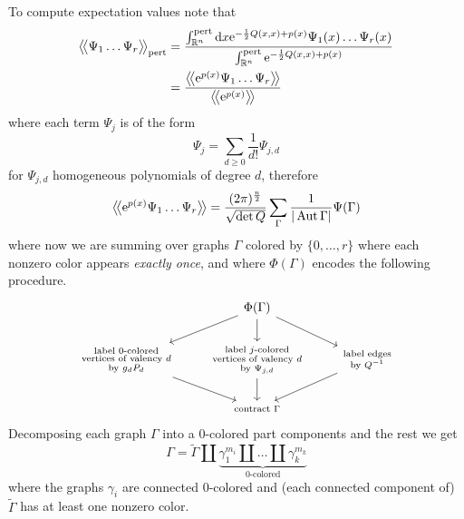 To compute expectation values note that
\begin{align*}
  \big \langle \! \big \langle {\Psi_1 \dots \Psi_r} \big \rangle \! \big \rangle_\text{pert}
  &= \frac{
    \int_{\mathbb{R}^n}^\text{pert} \mathrm{d} x
    \mathrm{e}^{-\frac{1}{2} Q(x, x) + p(x)} \Psi_1(x) \dots \Psi_r (x)
  }{
    \int_{\mathbb{R}^n}^\text{pert} \mathrm{e}^{-\frac{1}{2} Q(x, x) + p(x)}
  }\\
  &= \frac{
    \big \langle \! \big \langle {\mathrm{e}^{p(x)} \Psi_1 \dots \Psi_r} \big \rangle \! \big \rangle
  }{
  \big \langle \! \big \langle {\mathrm{e}^{p(x)}} \big \rangle \! \big \rangle
  }
\end{align*}
where each term $\Psi_j$ is of the form
\begin{equation*}
  \Psi_j = \sum_{d \geq 0} \frac{1}{d!} \Psi_{j, d}
\end{equation*}
for $\Psi_{j, d}$ homogeneous polynomials of degree $d$, therefore
\begin{equation*}
  \big \langle \! \big \langle {\mathrm{e}^{p(x)} \Psi_1 \dots \Psi_r} \big \rangle \! \big \rangle
  = \frac{(2 \pi)^{\frac{n}{2}}}{\sqrt{\det Q}}
  \sum_{\Gamma} \frac{1}{|\operatorname{Aut} \Gamma|} \Psi(\Gamma)
\end{equation*}
where now we are summing over graphs $\Gamma$ colored by $\{0, \dots, r\}$ where each nonzero color appears \textit{exactly once}, and where $\Phi(\Gamma)$ encodes the following procedure.
\begin{equation*}
  \begin{tikzcd}
    & \Phi(\Gamma) \arrow[dl] \arrow[d] \arrow[dr] & \\
    \substack{\text{label } 0 \text{-colored}\\
      \text{vertices of valency } d \\
    \text{by } g_d P_d} \arrow[dr] &
    \substack{\text{label } j \text{-colored}\\
      \text{vertices of valency } d \\
      \text{by } \Psi_{j, d}} \arrow[d] &
    \substack{\text{label edges}\\
      \text{by } Q^{-1}} \arrow[dl] \\
    &\text{\scriptsize contract $\Gamma$}&
  \end{tikzcd}
\end{equation*}
Decomposing each graph $\Gamma$ into a $0$-colored part components and the rest we get
\begin{equation*}
  \Gamma = \tilde{\Gamma} \amalg
  \underbrace{\gamma_1^{m_i} \amalg \dots \amalg \gamma_k^{m_k}}_{0\text{-colored}}
\end{equation*}
where the graphs $\gamma_i$ are connected $0$-colored and (each connected component of) $\tilde{\Gamma}$ has at least one nonzero color.
